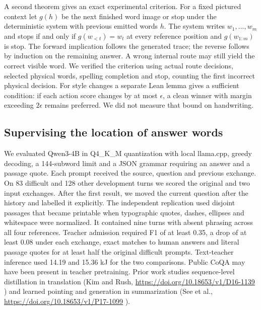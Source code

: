 \documentclass[12pt,a4paper]{article}
\providecommand{\DIFadd}[1]{{\protect\color{blue} \sf #1}} %
\begin{document}
\DIFadd{A second theorem gives an exact experimental criterion. For a fixed pictured context let $g(h)$ be the next finished word image or stop under the deterministic system with previous emitted words $h$. The system writes $w_1,\ldots,w_m$ and stops if and only if $g(w_{<t})=w_t$ at every reference position and $g(w_{1:m})$ is stop. The forward implication follows the generated trace; the reverse follows by induction on the remaining answer. A wrong internal route may still yield the correct visible word. We verified the criterion using actual route decisions, selected physical words, spelling completion and stop, counting the first incorrect physical decision. For style changes a separate Lean lemma gives a sufficient condition: if each action score changes by at most $\epsilon$, a clean winner with margin exceeding $2\epsilon$ remains preferred. We did not measure that bound on handwriting.
}

\subsection*{\DIFadd{Supervising the location of answer words}}
\DIFadd{We evaluated Qwen3-4B in Q4\_K\_M quantization with local llama.cpp, greedy decoding, a 144-subword limit and a JSON grammar requiring an answer and a passage quote. Each prompt received the source, question and previous exchange. On 83 difficult and 128 other development turns we scored the original and two input exchanges. After the first result, we moved the current question after the history and labelled it explicitly. The independent replication used disjoint passages that became printable when typographic quotes, dashes, ellipses and whitespace were normalized. It contained nine turns with absent phrasing across all four references. Teacher admission required F1 of at least 0.35, a drop of at least 0.08 under each exchange, exact matches to human answers and literal passage quotes for at least half the original difficult prompts. Text-teacher inference used 14.19 and 15.36 kJ for the two comparisons. Public CoQA may have been present in teacher pretraining. Prior work studies sequence-level distillation in translation (Kim and Rush, }\url{https://doi.org/10.18653/v1/D16-1139}\DIFadd{) and learned pointing and generation in summarization (See et al., }\url{https://doi.org/10.18653/v1/P17-1099}\DIFadd{).
}
\end{document}
